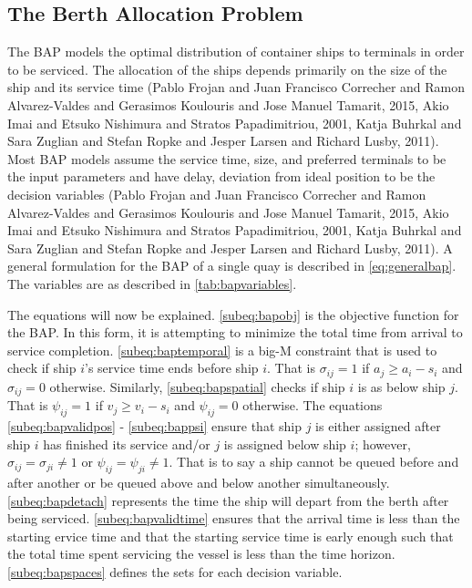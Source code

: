 \documentclass[11pt,a4paper,final]{article}
\begin{document}
\subsection{The Berth Allocation Problem}
\label{sec:orgfc280b4}
The BAP models the optimal distribution of container ships to terminals in order to be serviced. The allocation of the
ships depends primarily on the size of the ship and its service time
(Pablo Frojan and Juan Francisco Correcher and Ramon Alvarez-Valdes and Gerasimos Koulouris and Jose Manuel Tamarit, 2015, Akio Imai and Etsuko Nishimura and Stratos Papadimitriou, 2001, Katja Buhrkal and Sara Zuglian and Stefan Ropke and Jesper Larsen and Richard Lusby, 2011). Most BAP models assume the service
time, size, and preferred terminals to be the input parameters and have delay, deviation from ideal position to be the decision
variables (Pablo Frojan and Juan Francisco Correcher and Ramon Alvarez-Valdes and Gerasimos Koulouris and Jose Manuel Tamarit, 2015, Akio Imai and Etsuko Nishimura and Stratos Papadimitriou, 2001, Katja Buhrkal and Sara Zuglian and Stefan Ropke and Jesper Larsen and Richard Lusby, 2011). A general formulation for the
BAP of a single quay is described in \ref{eq:generalbap}. The variables are as described in \ref{tab:bapvariables}.

The equations will now be explained. \autoref{subeq:bapobj} is the objective function for the BAP. In this form, it is
attempting to minimize the total time from arrival to service completion. \autoref{subeq:baptemporal} is a big-M
constraint that is used to check if ship \(i\)'s service time ends before ship \(i\). That is \(\sigma_{ij}=1\) if \(a_j \ge a_i -
s_i\) and \(\sigma_{ij} = 0\) otherwise. Similarly, \autoref{subeq:bapspatial} checks if ship \(i\) is as below ship \(j\). That is
\(\psi_{ij} = 1\) if \(v_j \ge v_i - s_i\) and \(\psi_{ij} = 0\) otherwise. The equations \autoref{subeq:bapvalidpos} -
\autoref{subeq:bappsi} ensure that ship \(j\) is either assigned after ship \(i\) has finished its service and/or \(j\) is
assigned below ship \(i\); however, \(\sigma_{ij} = \sigma_{ji} \ne 1\) or \(\psi_{ij} = \psi_{ji} \ne 1\). That is to say a ship cannot be queued
before and after another or be queued above and below another simultaneously. \autoref{subeq:bapdetach} represents the
time the ship will depart from the berth after being serviced. \autoref{subeq:bapvalidtime} ensures that the arrival
time is less than the starting ervice time and that the starting service time is early enough such that the total time
spent servicing the vessel is less than the time horizon. \autoref{subeq:bapspaces} defines the sets for each decision
variable.
\end{document}
